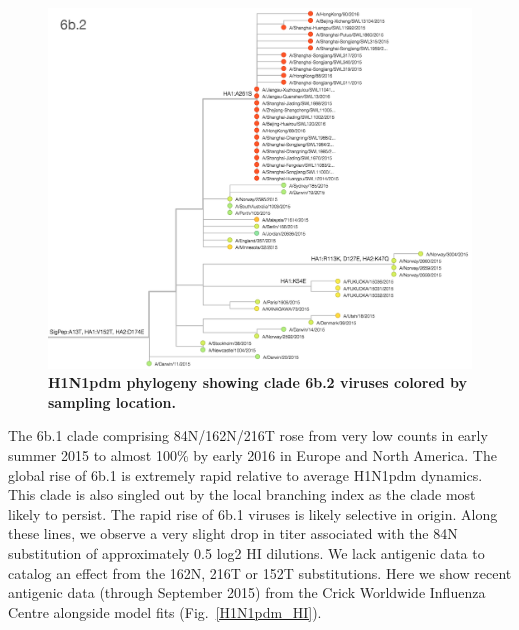 \documentclass[11pt,oneside,letterpaper]{article}
\begin{document}
\begin{figure}[H]
	\centering		
	\includegraphics[width=1.0\textwidth]{../figures/feb-2016/H1N1pdm_6b2_tree.png}
	\caption{\textbf{H1N1pdm phylogeny showing clade 6b.2 viruses colored by sampling location.} 
	}
	\label{H1N1pdm_6b2_tree}
\end{figure}

\pagebreak

The 6b.1 clade comprising 84N/162N/216T rose from very low counts in early summer 2015 to almost 100\% by early 2016 in Europe and North America. The global rise of 6b.1 is extremely rapid relative to average H1N1pdm dynamics. This clade is also singled out by the local branching index \cite{neher2014predicting} as the clade most likely to persist. The rapid rise of 6b.1 viruses is likely selective in origin. Along these lines, we observe a very slight drop in titer associated with the 84N substitution of approximately 0.5 log2 HI dilutions. We lack antigenic data to catalog an effect from the 162N, 216T or 152T substitutions. Here we show recent antigenic data (through September 2015) from the Crick Worldwide Influenza Centre alongside model fits \cite{neher2015prediction} (Fig.\ \ref{H1N1pdm_HI}).
\end{document}
